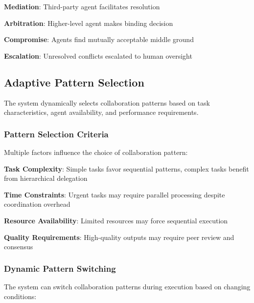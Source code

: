 \begin{compactlist}
    \item \textbf{Mediation}: Third-party agent facilitates resolution
    \item \textbf{Arbitration}: Higher-level agent makes binding decision
    \item \textbf{Compromise}: Agents find mutually acceptable middle ground
    \item \textbf{Escalation}: Unresolved conflicts escalated to human oversight
\end{compactlist}

\subsection*{Adaptive Pattern Selection}

The system dynamically selects collaboration patterns based on task characteristics, agent availability, and performance requirements.

\subsubsection*{Pattern Selection Criteria}

Multiple factors influence the choice of collaboration pattern:

\begin{expandedlist}
    \item \textbf{Task Complexity}: Simple tasks favor sequential patterns, complex tasks benefit from hierarchical delegation
    \item \textbf{Time Constraints}: Urgent tasks may require parallel processing despite coordination overhead
    \item \textbf{Resource Availability}: Limited resources may force sequential execution
    \item \textbf{Quality Requirements}: High-quality outputs may require peer review and consensus
\end{expandedlist}

\subsubsection*{Dynamic Pattern Switching}

The system can switch collaboration patterns during execution based on changing conditions:

